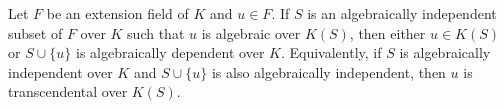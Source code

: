 Let $F$ be an extension field of $K$ and $u \in F$.
If $S$ is an algebraically independent subset of $F$ over $K$ such that $u$ is algebraic over $K(S)$, then either $u \in K(S)$ or $S \cup \{u\}$ is algebraically dependent over $K$.
Equivalently, if $S$ is algebraically independent over $K$ and $S \cup \{u\}$ is also algebraically independent, then $u$ is transcendental over $K(S)$.
